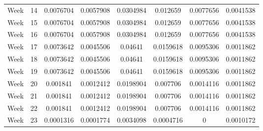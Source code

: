 \begin{center}
\begin{longtable}{cccccccc}
        Week & 14 & 0.0076704 & 0.0057908 & 0.0304984 & 0.012659 & 0.0077656 & 0.0041538 \\  
        Week & 15 & 0.0076704 & 0.0057908 & 0.0304984 & 0.012659 & 0.0077656 & 0.0041538 \\  
        Week & 16 & 0.0076704 & 0.0057908 & 0.0304984 & 0.012659 & 0.0077656 & 0.0041538 \\  
        Week & 17 & 0.0073642 & 0.0045506 & 0.04641 & 0.0159618 & 0.0095306 & 0.0011862 \\  
        Week & 18 & 0.0073642 & 0.0045506 & 0.04641 & 0.0159618 & 0.0095306 & 0.0011862 \\  
        Week & 19 & 0.0073642 & 0.0045506 & 0.04641 & 0.0159618 & 0.0095306 & 0.0011862 \\  
        Week & 20 & 0.001841 & 0.0012412 & 0.0198904 & 0.007706 & 0.0014116 & 0.0011862 \\  
        Week & 21 & 0.001841 & 0.0012412 & 0.0198904 & 0.007706 & 0.0014116 & 0.0011862 \\  
        Week & 22 & 0.001841 & 0.0012412 & 0.0198904 & 0.007706 & 0.0014116 & 0.0011862 \\  
        Week & 23 & 0.0001316 & 0.0001774 & 0.0034098 & 0.0004716 & 0 & 0.0010172 \\
        \hline
    \end{longtable}
 \label{tab:deptripct}
\end{center}


